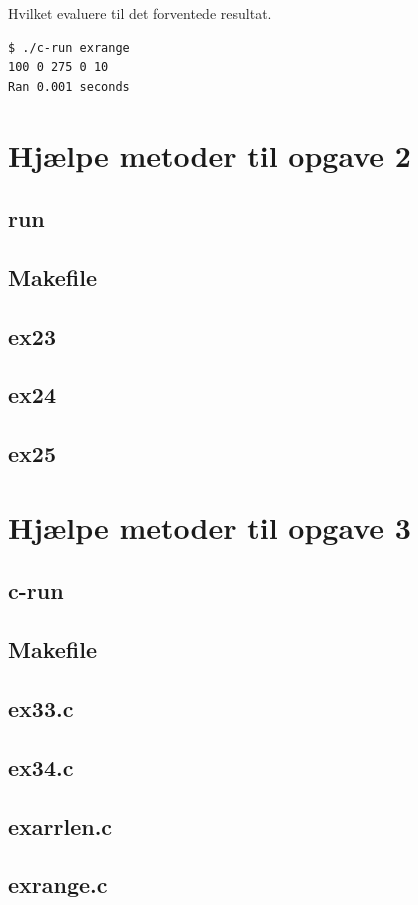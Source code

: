 \documentclass[danish,a4paper]{report}
\begin{document}


Hvilket evaluere til det forventede resultat.

\begin{lstlisting}[language=bash]
$ ./c-run exrange
100 0 275 0 10
Ran 0.001 seconds
\end{lstlisting}

\appendix
\chapter{Hjælpe metoder til opgave 2}
\section*{run}

\section*{Makefile}

\section*{ex23}

\section*{ex24}

\section*{ex25}


\chapter{Hjælpe metoder til opgave 3}
\section*{c-run}

\section*{Makefile}

\section*{ex33.c}

\section*{ex34.c}

\section*{exarrlen.c}

\section*{exrange.c}

\label{LastPage}
\end{document}
